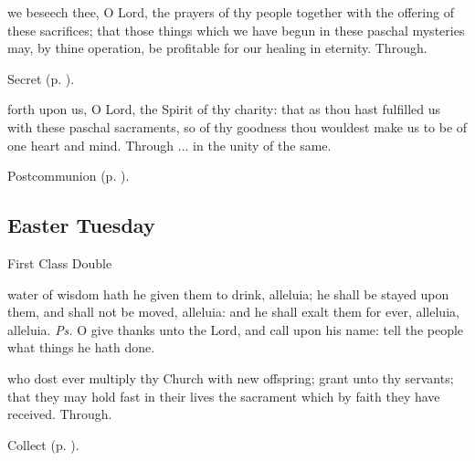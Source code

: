 
\secret
{} we beseech thee, O Lord, the prayers of thy people together with the offering of these sacrifices; that those things which we have begun in these paschal mysteries may, by thine operation, be profitable for our healing in eternity. Through.
\begin{rubric}
     Secret  (p. \pageref{EasterSecret}).
\end{rubric}


\postcommunion
{} forth upon us, O Lord, the Spirit of thy charity: that as thou hast fulfilled us with these paschal sacraments, so of thy goodness thou wouldest make us to be of one heart and mind. Through ... in the unity of the same.
\begin{rubric}
     Postcommunion  (p. \pageref{EasterPostcommunion}).
\end{rubric}


\clearpage
\subsection{Easter Tuesday}
\begin{inhead}
    {First Class Double}
\end{inhead}

\introit
{} water of wisdom hath he given them to drink, alleluia; he shall be stayed upon them, and shall not be moved, alleluia: and he shall exalt them for ever, alleluia, alleluia. \textit{Ps.} O give thanks unto the Lord, and call upon his name: tell the people what things he hath done.

\collect
 who dost ever multiply thy Church with new offspring; grant unto thy servants; that they may hold fast in their lives the sacrament which by faith they have received. Through.
\begin{rubric}
     Collect  (p. \pageref{EasterCollect}).
\end{rubric}

